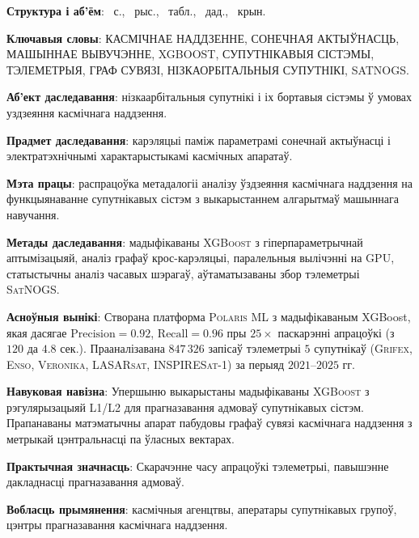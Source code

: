 \textbf{Структура і аб’ём}: \maincontentpages~с., \totalfigures~рыс.,
\totaltables~табл., ~дад., \thetotalsources~крын.

\textbf{Ключавыя словы}: КАСМІЧНАЕ НАДДЗЕННЕ, СОНЕЧНАЯ АКТЫЎНАСЦЬ, МАШЫННАЕ ВЫВУЧЭННЕ, XGBOOST, СУПУТНІКАВЫЯ СІСТЭМЫ, ТЭЛЕМЕТРЫЯ, ГРАФ СУВЯЗІ, НІЗКАОРБІТАЛЬНЫЯ СУПУТНІКІ, SATNOGS.

\textbf{Аб’ект даследавання}: нізкаарбітальныя супутнікі і іх бортавыя сістэмы ў умовах уздзеяння касмічнага наддзення.

\textbf{Прадмет даследавання}: карэляцыі паміж параметрамі сонечнай актыўнасці і электратэхнічнымі характарыстыкамі касмічных апаратаў.

\textbf{Мэта працы}: распрацоўка метадалогіі аналізу ўздзеяння касмічнага наддзення на функцыянаванне супутнікавых сістэм з выкарыстаннем алгарытмаў машыннага навучання.

\textbf{Метады даследавання}: мадыфікаваны \textsc{XGBoost} з гіперпараметрычнай аптымізацыяй, аналіз графаў крос-карэляцыі, паралельныя вылічэнні на \textsc{GPU}, статыстычны аналіз часавых шэрагаў, аўтаматызаваны збор тэлеметрыі \textsc{SatNOGS}.

\textbf{Асноўныя вынікі}: Створана платформа \textsc{Polaris ML} з мадыфікаваным XGBoost, якая дасягае 
$\text{Precision} = 0.92$, $\text{Recall} = 0.96$ пры $25{\times}$ паскарэнні апрацоўкі (з $120$ да $4.8$ сек.). Прааналізавана $847{\,}326$ запісаў тэлеметрыі $5$ супутнікаў (\textsc{Grifex}, \textsc{Enso}, \textsc{Veronika}, \textsc{LASARsat}, \textsc{INSPIRESat-1}) за перыяд $2021$--$2025$ гг.

\textbf{Навуковая навізна}: Упершыню выкарыстаны мадыфікаваны \textsc{XGBoost} з рэгулярызацыяй L1/L2 для прагназавання адмоваў супутнікавых сістэм. Прапанаваны матэматычны апарат пабудовы графаў сувязі касмічнага наддзення з метрыкай цэнтральнасці па ўласных вектарах.

\textbf{Практычная значнасць}: Скарачэнне часу апрацоўкі тэлеметрыі, павышэнне дакладнасці прагназавання адмоваў.

\textbf{Вобласць прымянення}: касмічныя агенцтвы, аператары супутнікавых групоў, цэнтры прагназавання касмічнага наддзення.
